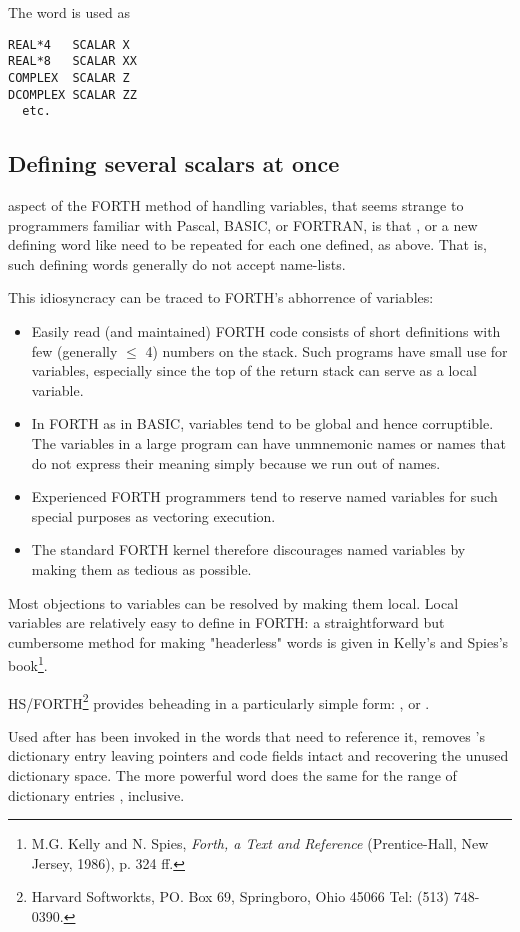 The word  is used as
\begin{lstlisting}
REAL*4   SCALAR X
REAL*8   SCALAR XX
COMPLEX  SCALAR Z
DCOMPLEX SCALAR ZZ
  etc.
\end{lstlisting}

\subsection{Defining several scalars at once}
 aspect of the FORTH method of handling variables, that seems strange to programmers familiar with Pascal, BASIC, or FORTRAN, is that ,  or a new defining word like  need to be repeated for each one defined, as above. That is, such defining words generally do not accept name-lists.

This idiosyncracy can be traced to FORTH's abhorrence of variables:
\begin{itemize}
    \item Easily read (and maintained) FORTH code consists of short definitions with few (generally $\leq$ 4) numbers on the stack. Such programs have small use for variables, especially since the top of the return stack can serve as a local variable.
    \item In FORTH as in BASIC, variables tend to be global and hence corruptible. The variables in a large program can have unmnemonic names or names that do not express their meaning simply because we run out of names.
    \item Experienced FORTH programmers tend to reserve named variables for such special purposes as vectoring execution.
    \item The standard FORTH kernel therefore discourages named variables by making them as tedious as possible.
\end{itemize}

Most objections to variables can be resolved by making them local. Local variables are relatively easy to define in FORTH: a straightforward but cumbersome method for making "headerless" words is given in Kelly's and Spies's book\footnote{M.G. Kelly and N. Spies, \textit{Forth, a Text and Reference} (Prentice-Hall, New Jersey, 1986), p. 324 ff.}.

HS/FORTH\footnote{Harvard Softworkts, PO. Box 69, Springboro, Ohio 45066 Tel: (513) 748-0390.} provides beheading in a particularly simple form: , or .

Used after  has been invoked in the words that need to reference it,  removes 's dictionary entry leaving pointers and code fields intact and recovering the unused dictionary space. The more powerful word  does the same for the range of dictionary entries , inclusive.

